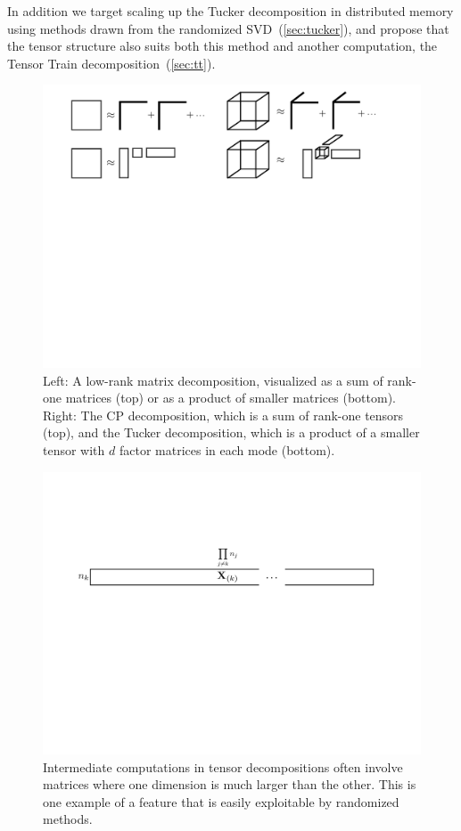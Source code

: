 In addition we target scaling up the Tucker decomposition in distributed memory using methods drawn from the randomized SVD~(\cref{sec:tucker}), and propose that the tensor structure also suits both this method and another computation, the Tensor Train decomposition~(\cref{sec:tt}). 
%
\begin{figure}[ht]
  \centering 
  \includegraphics[width=\linewidth]{thpropfigs/decomps}
  \caption{Left: A low-rank matrix decomposition, visualized as a sum of rank-one matrices (top) or as a product of smaller matrices (bottom). Right: The CP decomposition, which is a sum of rank-one tensors (top), and the Tucker decomposition, which is a product of a smaller tensor with $d$ factor matrices in each mode (bottom).}
  \label{fig:decomps}
\end{figure}
%
\begin{figure}[ht]
  \centering 
  \includegraphics[width=0.85\linewidth]{thpropfigs/overdetermine}
  \caption{Intermediate computations in tensor decompositions often involve matrices where one dimension is much larger than the other. This is one example of a feature that is easily exploitable by randomized methods.}
  \label{fig:overdetermine}
\end{figure}
%

